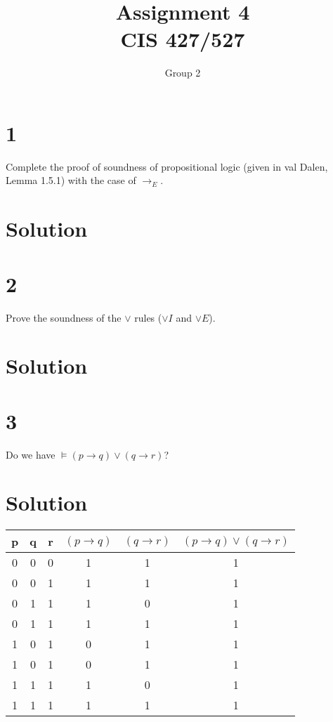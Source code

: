 \documentclass[10pt]{article}
\begin{document}
\title{Assignment \raisebox{.22ex}{\large\#}4 \\
	CIS 427/527}
\author{Group 2}

\maketitle

\section*{1}

Complete the proof of soundness of propositional logic (given in val Dalen, Lemma 1.5.1) with the case of $\to _E$.

\section*{Solution}


\section*{2}

Prove the soundness of the $\lor$ rules ($\lor I$ and $\lor E$).

\section*{Solution}

\section*{3}

Do we have $\models (p \to q) \lor (q\to r)$?

\section*{Solution}


\begin{tabular}{ c | c | c | c | c || c }    
  p & q & r & $(p\to q)$ & $(q\to r)$ & $(p\to q)\lor (q\to r)$\\
  \hline
  0 & 0 & 0 & 1 & 1 & 1\\
  0 & 0 & 1 & 1 & 1 & 1\\
  0 & 1 & 1 & 1 & 0 & 1\\
  0 & 1 & 1 & 1 & 1 & 1\\
  1 & 0 & 1 & 0 & 1 & 1\\
  1 & 0 & 1 & 0 & 1 & 1\\
  1 & 1 & 1 & 1 & 0 & 1\\
  1 & 1 & 1 & 1 & 1 & 1\\
\end{tabular}
\end{document}
